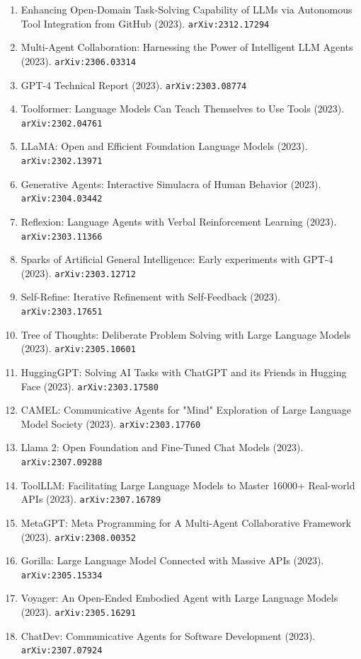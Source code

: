 \documentclass[11pt]{article}
\begin{document}
\begin{enumerate}
  \item Enhancing Open-Domain Task-Solving Capability of LLMs via Autonomous Tool Integration from GitHub (2023). \texttt{arXiv:2312.17294}
  \item Multi-Agent Collaboration: Harnessing the Power of Intelligent LLM
  Agents (2023). \texttt{arXiv:2306.03314}
  \item GPT-4 Technical Report (2023). \texttt{arXiv:2303.08774}
  \item Toolformer: Language Models Can Teach Themselves to Use Tools (2023). \texttt{arXiv:2302.04761}
  \item LLaMA: Open and Efficient Foundation Language Models (2023). \texttt{arXiv:2302.13971}
  \item Generative Agents: Interactive Simulacra of Human Behavior (2023). \texttt{arXiv:2304.03442}
  \item Reflexion: Language Agents with Verbal Reinforcement Learning (2023). \texttt{arXiv:2303.11366}
  \item Sparks of Artificial General Intelligence: Early experiments with GPT-4 (2023). \texttt{arXiv:2303.12712}
  \item Self-Refine: Iterative Refinement with Self-Feedback (2023). \texttt{arXiv:2303.17651}
  \item Tree of Thoughts: Deliberate Problem Solving with Large Language Models (2023). \texttt{arXiv:2305.10601}
  \item HuggingGPT: Solving AI Tasks with ChatGPT and its Friends in Hugging
  Face (2023). \texttt{arXiv:2303.17580}
  \item CAMEL: Communicative Agents for "Mind" Exploration of Large Language
  Model Society (2023). \texttt{arXiv:2303.17760}
  \item Llama 2: Open Foundation and Fine-Tuned Chat Models (2023). \texttt{arXiv:2307.09288}
  \item ToolLLM: Facilitating Large Language Models to Master 16000+ Real-world
  APIs (2023). \texttt{arXiv:2307.16789}
  \item MetaGPT: Meta Programming for A Multi-Agent Collaborative Framework (2023). \texttt{arXiv:2308.00352}
  \item Gorilla: Large Language Model Connected with Massive APIs (2023). \texttt{arXiv:2305.15334}
  \item Voyager: An Open-Ended Embodied Agent with Large Language Models (2023). \texttt{arXiv:2305.16291}
  \item ChatDev: Communicative Agents for Software Development (2023). \texttt{arXiv:2307.07924}

\end{enumerate}
\end{document}
